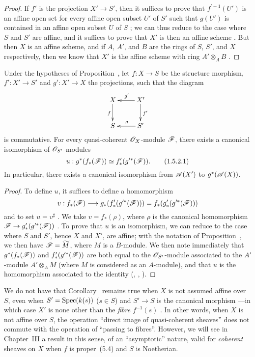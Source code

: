 \begin{proof}
If $f'$ is the projection $X'\to S'$, then it suffices to prove that $f^{\prime-1}(U')$ is an affine open set for every affine open subset $U'$ of $S'$ such that $g(U')$ is contained in an affine open subset $U$ of $S$ ; we can thus reduce to the case where $S$ and $S'$ are affine, and it suffices to prove that $X'$ is then an affine scheme .
But then  $X$ is an affine scheme, and if $A$, $A'$, and $B$ are the rings of $S$, $S'$, and $X$ respectively, then we know that $X'$ is the affine scheme with ring $A'\otimes_A B$ .
\end{proof}

\begin{corollary}[1.5.2]
\label{II.1.5.2}
Under the hypotheses of Proposition~, let $f:X\to S$ be the structure morphism, $f':X'\to S'$ and $g':X'\to X$ the projections, such that the diagram
\[
  \xymatrix{
    X\ar[d]_f &
    X'\ar[l]_{g'}\ar[d]^{f'}\\
    S &
    S'\ar[l]_g
  }
\]
is commutative.
For every quasi-coherent $\mathscr{O}_X$-module $\mathscr{F}$, there exists a canonical isomorphism of $\mathscr{O}_{S'}$-modules
\[
\label{II.1.5.2.1}
  u:g^*(f_*(\mathscr{F}))\simeq f_*'(g^{\prime*}(\mathscr{F})).
  \tag{1.5.2.1}
\]
In particular, there exists a canonical isomorphism from $\mathscr{A}(X')$ to $g^*(\mathscr{A}(X))$.
\end{corollary}

\begin{proof}
To define $u$, it suffices to define a homomorphism
\[
  v:f_*(\sh{F})\to g_*(f_*'(g^{\prime*}(\sh{F})))=f_*(g_*'(g^{\prime*}(\sh{F})))
\]
and to set $u=v^\sharp$ .
We take $v=f_*(\rho)$, where $\rho$ is the canonical homomorphism $\sh{F}\to g_*'(g^{\prime*}(\sh{F}))$ .
To prove that $u$ is an isomorphism, we can reduce to the case where $S$ and $S'$, hence $X$ and $X'$, are affine; with the notation of Proposition~, we then have $\mathscr{F}=\widetilde{M}$, where $M$ is a $B$-module.
We then note immediately that $g^*(f_*(\mathscr{F}))$ and $f_*'(g^{\prime*}(\mathscr{F}))$ are both equal to the $\mathscr{O}_{S'}$-module associated to the $A'$-module $A'\otimes_A M$ (where $M$ is considered as an $A$-module), and that $u$ is the homomorphism associated to the identity (, , ).
\end{proof}

\begin{remark}[1.5.3]
\label{II.1.5.3}
We do not have that Corollary~ remains true when $X$ is not assumed affine over $S$, even when $S'=\operatorname{Spec}(k(s))$ ($s\in S$) and $S'\to S$ is the canonical morphism ---in which case $X'$ is none other than the \emph{fibre $f^{-1}(s)$} .
In other words, when $X$ is not affine over $S$, the operation
``direct image of quasi-coherent sheaves'' does not commute with the operation of ``passing to fibres''.
However, we will see in Chapter~III  a result in this sense, of an ``asymptotic'' nature, valid for \emph{coherent} sheaves on $X$ when $f$ is proper~(5.4) and $S$ is Noetherian.
\end{remark}


